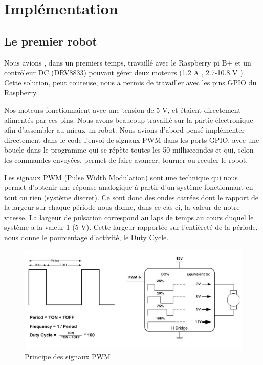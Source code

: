 \documentclass[12pt,a4paper]{report}
\begin{document}
\chapter{Implémentation}

\section{Le premier robot}

Nous avions , dans un premiers temps, travaillé avec le Raspberry pi B+ et un contrôleur DC (DRV8833) pouvant gérer deux moteurs (1.2 A , 2.7-10.8 V ). Cette solution, peut couteuse, nous a permis de travailler avec les pins GPIO du Raspberry.

Nos moteurs fonctionnaient avec une tension de 5 V, et étaient directement alimentés par ces pins. Nous avons beaucoup travaillé sur la partie électronique afin d'assembler au mieux un robot. Nous avions d'abord pensé implémenter directement dans le code l'envoi de signaux PWM dans les ports GPIO, avec une boucle dans le programme qui se répète toutes les 50 millisecondes et qui, selon les commandes envoyées, permet de faire avancer, tourner ou reculer le robot.

Les signaux PWM (Pulse Width Modulation) sont une technique qui nous permet d'obtenir une réponse analogique à partir d'un système fonctionnant en tout ou rien (système discret). Ce sont donc des ondes carrées dont le rapport de la largeur sur chaque période nous donne, dans ce cas-ci, la valeur de notre vitesse.
La largeur de pulsation correspond au laps de temps au cours duquel le système a la valeur 1 (5 V). Cette largeur rapportée sur l'entièreté de la période, nous donne le pourcentage d'activité, le Duty Cycle.

\begin{figure}[hf!]
\center
\includegraphics[scale=0.4]{images/PWM/totzal.png}
\caption{Principe des signaux PWM}
\end{figure}
\end{document}
